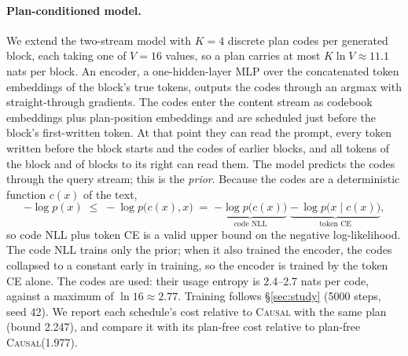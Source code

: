 \documentclass{article}
\theoremstyle{definition}
\theoremstyle{remark}
\newcommand{\name}[1]{\textup{\textsc{#1}}}
\newcommand{\causal}{\name{Causal}\xspace}
\begin{document}
\paragraph{Plan-conditioned model.}
We extend the two-stream model with $K=4$ discrete plan codes per generated block, each taking one of $V=16$ values, so a plan carries at most $K\ln V\approx11.1$ nats per block.
An encoder, a one-hidden-layer MLP over the concatenated token embeddings of the block's true tokens, outputs the codes through an argmax with straight-through gradients.
The codes enter the content stream as codebook embeddings plus plan-position embeddings and are scheduled just before the block's first-written token.
At that point they can read the prompt, every token written before the block starts and the codes of earlier blocks, and all tokens of the block and of blocks to its right can read them.
The model predicts the codes through the query stream; this is the \emph{prior}.
Because the codes are a deterministic function $c(x)$ of the text,
\begin{equation}
  -\log p(x)\;\le\;-\log p\big(c(x),x\big)\;=\;\underbrace{-\log p\big(c(x)\big)}_{\text{code NLL}}\;\underbrace{-\,\log p\big(x\mid c(x)\big)}_{\text{token CE}},
  \label{eq:planbound}
\end{equation}
so code NLL plus token CE is a valid upper bound on the negative log-likelihood.
The code NLL trains only the prior; when it also trained the encoder, the codes collapsed to a constant early in training, so the encoder is trained by the token CE alone.
The codes are used: their usage entropy is 2.4--2.7 nats per code, against a maximum of $\ln16\approx2.77$.
Training follows \S\ref{sec:study} (5000 steps, seed 42).
We report each schedule's cost relative to \causal with the same plan (bound 2.247), and compare it with its plan-free cost relative to plan-free \causal (1.977).
\end{document}
